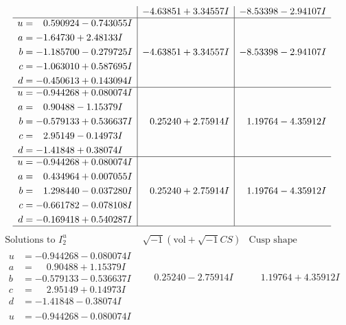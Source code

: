 \documentclass[1p]{elsarticle_modified}
\theoremstyle{definition}
\newcommand{\I}{\sqrt{-1}}
\begin{document}
$$\begin{array}{c|c|c}
 & -4.63851 + 3.34557 I & -8.53398 - 2.94107 I \\ \hline\begin{aligned}
u &= \phantom{-}0.590924 - 0.743055 I \\
a &= -1.64730 + 2.48133 I \\
b &= -1.185700 - 0.279725 I \\
c &= -1.063010 + 0.587695 I \\
d &= -0.450613 + 0.143094 I\end{aligned}
 & -4.63851 + 3.34557 I & -8.53398 - 2.94107 I \\ \hline\begin{aligned}
u &= -0.944268 + 0.080074 I \\
a &= \phantom{-}0.90488 - 1.15379 I \\
b &= -0.579133 + 0.536637 I \\
c &= \phantom{-}2.95149 - 0.14973 I \\
d &= -1.41848 + 0.38074 I\end{aligned}
 & \phantom{-}0.25240 + 2.75914 I & \phantom{-}1.19764 - 4.35912 I \\ \hline\begin{aligned}
u &= -0.944268 + 0.080074 I \\
a &= \phantom{-}0.434964 + 0.007055 I \\
b &= \phantom{-}1.298440 - 0.037280 I \\
c &= -0.661782 - 0.078108 I \\
d &= -0.169418 + 0.540287 I\end{aligned}
 & \phantom{-}0.25240 + 2.75914 I & \phantom{-}1.19764 - 4.35912 I\\
 \hline 
 \end{array}$$\newpage$$\begin{array}{c|c|c}  
\text{Solutions to }I^u_{2}& \I (\text{vol} + \sqrt{-1}CS) & \text{Cusp shape}\\
 \hline 
\begin{aligned}
u &= -0.944268 - 0.080074 I \\
a &= \phantom{-}0.90488 + 1.15379 I \\
b &= -0.579133 - 0.536637 I \\
c &= \phantom{-}2.95149 + 0.14973 I \\
d &= -1.41848 - 0.38074 I\end{aligned}
 & \phantom{-}0.25240 - 2.75914 I & \phantom{-}1.19764 + 4.35912 I \\ \hline\begin{aligned}
u &= -0.944268 - 0.080074 I \\

\end{aligned}
\end{array}$$
\end{document}
